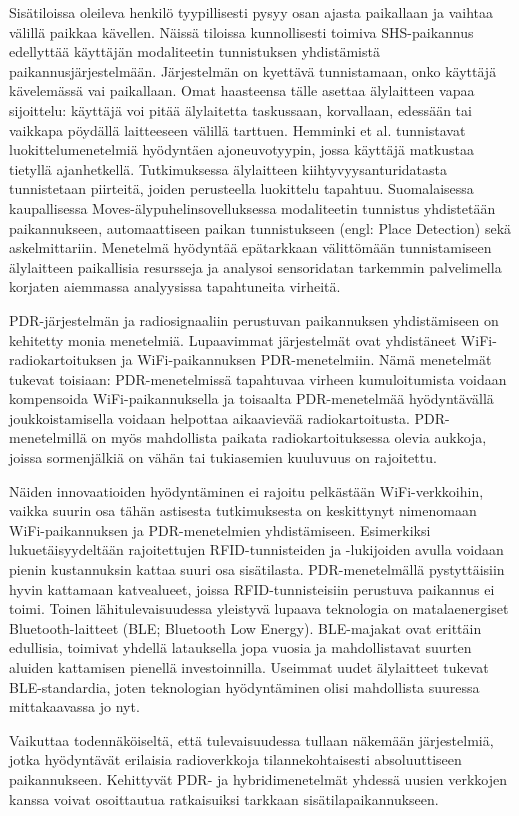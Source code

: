 Sisätiloissa oleileva henkilö tyypillisesti pysyy osan ajasta paikallaan
ja vaihtaa välillä paikkaa kävellen. Näissä tiloissa kunnollisesti toimiva
SHS-paikannus edellyttää käyttäjän modaliteetin
tunnistuksen yhdistämistä paikannusjärjestelmään.
Järjestelmän on kyettävä tunnistamaan, onko käyttäjä kävelemässä vai paikallaan.
Omat haasteensa tälle asettaa älylaitteen vapaa sijoittelu: käyttäjä voi
pitää älylaitetta taskussaan, korvallaan, edessään tai vaikkapa pöydällä
laitteeseen välillä tarttuen. Hemminki et al. \cite{hemminki2013} tunnistavat
luokittelumenetelmiä hyödyntäen ajoneuvotyypin, jossa käyttäjä matkustaa
tietyllä ajanhetkellä. Tutkimuksessa älylaitteen kiihtyvyysanturidatasta
tunnistetaan piirteitä, joiden perusteella luokittelu tapahtuu. Suomalaisessa
kaupallisessa Moves-älypuhelinsovelluksessa modaliteetin tunnistus yhdistetään
paikannukseen, automaattiseen paikan tunnistukseen (engl: Place Detection)
sekä askelmittariin. Menetelmä hyödyntää epätarkkaan välittömään tunnistamiseen
älylaitteen paikallisia resursseja ja analysoi sensoridatan tarkemmin
palvelimella korjaten aiemmassa analyysissa tapahtuneita virheitä.

PDR-järjestelmän ja radiosignaaliin perustuvan paikannuksen yhdistämiseen on
kehitetty monia menetelmiä. Lupaavimmat järjestelmät ovat yhdistäneet
WiFi-radiokartoituksen ja WiFi-paikannuksen PDR-menetelmiin.
Nämä menetelmät tukevat toisiaan: PDR-menetelmissä tapahtuvaa virheen
kumuloitumista voidaan kompensoida WiFi-paikannuksella ja toisaalta
PDR-menetelmää hyödyntävällä joukkoistamisella voidaan helpottaa
aikaavievää radiokartoitusta. PDR-menetelmillä on myös mahdollista paikata
radiokartoituksessa olevia aukkoja, joissa sormenjälkiä on vähän tai 
tukiasemien kuuluvuus on rajoitettu.

Näiden innovaatioiden hyödyntäminen ei rajoitu pelkästään WiFi-verkkoihin,
vaikka suurin osa tähän astisesta tutkimuksesta on keskittynyt
nimenomaan WiFi-paikannuksen ja PDR-menetelmien yhdistämiseen. Esimerkiksi
lukuetäisyydeltään rajoitettujen RFID-tunnisteiden ja -lukijoiden avulla
voidaan pienin kustannuksin kattaa suuri osa sisätilasta. PDR-menetelmällä
pystyttäisiin hyvin kattamaan katvealueet, joissa RFID-tunnisteisiin
perustuva paikannus ei toimi. Toinen lähitulevaisuudessa yleistyvä lupaava
teknologia on matalaenergiset Bluetooth-laitteet (BLE; Bluetooth Low Energy).
BLE-majakat ovat erittäin edullisia, toimivat yhdellä latauksella jopa
vuosia ja mahdollistavat suurten aluiden kattamisen pienellä investoinnilla.
Useimmat uudet älylaitteet tukevat BLE-standardia, joten teknologian
hyödyntäminen olisi mahdollista suuressa mittakaavassa jo nyt.

Vaikuttaa todennäköiseltä, että tulevaisuudessa tullaan näkemään
järjestelmiä, jotka hyödyntävät erilaisia radioverkkoja
tilannekohtaisesti absoluuttiseen paikannukseen. Kehittyvät PDR- ja
hybridimenetelmät yhdessä uusien verkkojen kanssa voivat osoittautua
ratkaisuiksi tarkkaan sisätilapaikannukseen.
